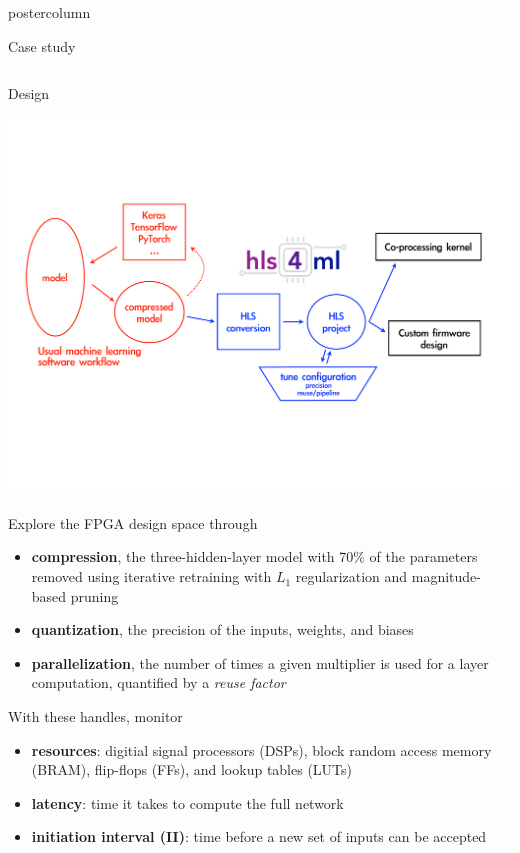 \documentclass[final,hyperref={pdfpagelabels=false}]{beamer}
\begin{document}
\begin{frame}
\begin{columns}
\begin{column}{.49\textwidth}
\begin{beamercolorbox}[center,wd=\textwidth]{postercolumn}
\begin{minipage}[T]{.95\textwidth}
{\begin{block}{Case study}
\begin{columns}
\begin{column}{.49\textwidth}
                \end{column}
                \end{columns}
              \end{block}
            \begin{block}{Design}
                  \begin{center}
                    \includegraphics[width=\linewidth]{figures/flow-hls4ml.pdf}
                  \end{center}
                Explore the FPGA design space through
                \begin{itemize}
                \item {\bf compression}, the three-hidden-layer model with 70\% of the parameters removed using iterative retraining with $L_1$ regularization and magnitude-based pruning
                \item {\bf quantization}, the precision of the inputs, weights, and biases
                \item {\bf parallelization}, the number of times a
                  given multiplier is used for a layer computation,
                  quantified by a \emph{reuse factor}
                \end{itemize}
                \vspace{0.5in}
                With these handles, monitor 
                \begin{itemize}
                \item {\bf resources}: digitial signal processors
                  (DSPs), block random access memory (BRAM), flip-flops (FFs), and lookup tables (LUTs)
                \item {\bf latency}: time it takes to compute the full network
                \item {\bf initiation interval (II)}: time before a new set of inputs can be accepted
                \end{itemize}
              \end{block}
              
}
\end{minipage}
\end{beamercolorbox}
\end{column}
\end{columns}
\end{frame}
\end{document}
